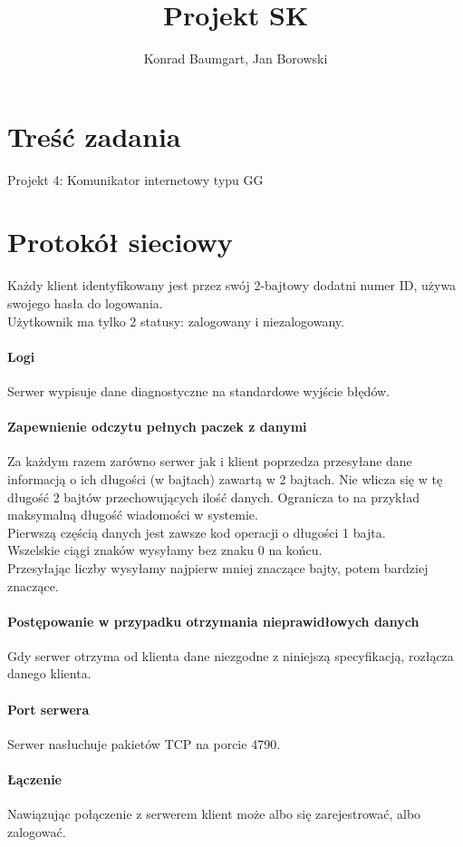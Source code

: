 \documentclass[10pt,a4paper]{article}
\author{Konrad Baumgart, Jan Borowski}
\title{Projekt SK}
\begin{document}
\maketitle

\section{Treść zadania}
	Projekt 4: Komunikator internetowy typu GG

\section{Protokół sieciowy}
	Każdy klient identyfikowany jest przez swój 2-bajtowy dodatni numer ID, używa swojego hasła do logowania.\\
	Użytkownik ma tylko 2 statusy: zalogowany i niezalogowany.
	
	\paragraph{Logi}
		Serwer wypisuje dane diagnostyczne na standardowe wyjście błędów.
	\paragraph{Zapewnienie odczytu pełnych paczek z danymi}
		Za każdym razem zarówno serwer jak i klient poprzedza przesyłane dane
		informacją o ich długości (w bajtach) zawartą w 2 bajtach. Nie wlicza się w tę długość
		2 bajtów przechowujących ilość danych.
		Ogranicza to na przykład maksymalną	długość wiadomości w systemie.\\
		Pierwszą częścią danych jest zawsze kod operacji o długości 1 bajta.\\
		Wszelskie ciągi znaków wysyłamy bez znaku 0 na końcu.\\
		Przesyłając liczby wysyłamy najpierw mniej znaczące bajty, potem bardziej znaczące.
	\paragraph{Postępowanie w przypadku otrzymania nieprawidłowych danych}
		Gdy serwer otrzyma od klienta dane niezgodne z niniejszą specyfikacją, rozłącza danego klienta.
	\paragraph{Port serwera} Serwer nasłuchuje pakietów TCP na porcie 4790.
	\paragraph{Łączenie} Nawiązując połączenie z serwerem klient może albo się zarejestrować, albo zalogować.
\end{document}

